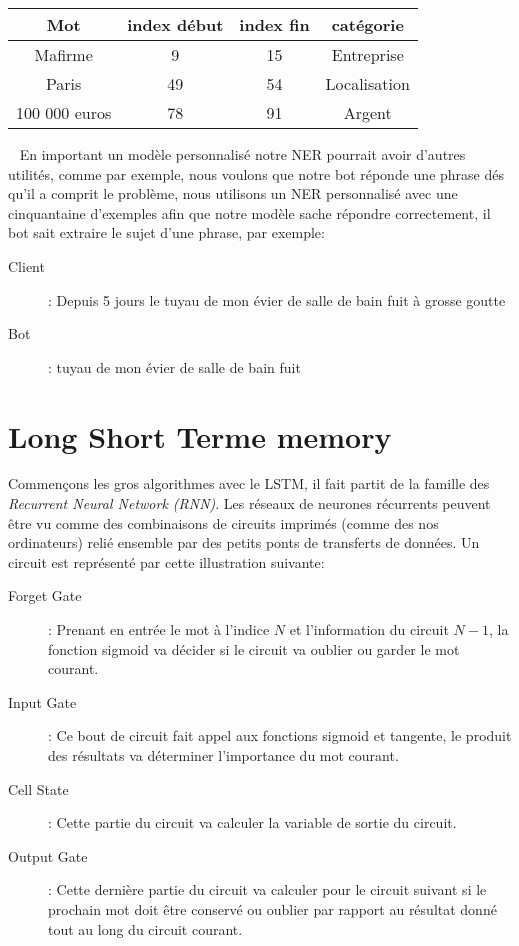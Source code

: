 
\begin{tabular}{c|cc|c}
Mot & index début & index fin & catégorie \\
\hline
Mafirme & 9 & 15 & Entreprise\\
Paris & 49 & 54 & Localisation\\
100 000 euros & 78 & 91 & Argent\\
\end{tabular}

\ \linebreak
En important un modèle personnalisé notre NER pourrait avoir d'autres utilités, comme par exemple, nous voulons que notre bot réponde une phrase dés qu'il a comprit le problème, nous utilisons un NER personnalisé avec une cinquantaine d'exemples afin que notre modèle sache répondre correctement, il bot sait extraire le sujet d'une phrase, par exemple:

\begin{description}
\item[Client]: Depuis 5 jours le tuyau de mon évier de salle de bain fuit à grosse goutte
\item[Bot]: tuyau de mon évier de salle de bain fuit
\end{description}

\pagebreak
\section{Long Short Terme memory}
Commençons les gros algorithmes avec le LSTM, il fait partit de la famille des \textit{Recurrent Neural Network (RNN)}. Les réseaux de neurones récurrents peuvent être vu comme des combinaisons de circuits imprimés (comme des nos ordinateurs) relié ensemble par des petits ponts de transferts de données. 
Un circuit est représenté par cette illustration suivante:


\begin{description}
\item[Forget Gate]: Prenant en entrée le mot à l'indice $N$ et l'information du circuit $N-1$, 
la fonction sigmoid va décider si le circuit va oublier ou garder le mot courant. 
\item[Input Gate]: Ce bout de circuit fait appel aux fonctions sigmoid et tangente, le produit des résultats va déterminer l'importance du mot courant.
\item[Cell State]: Cette partie du circuit va calculer la variable de sortie du circuit.
\item[Output Gate]: Cette dernière partie du circuit va calculer pour le circuit suivant si le prochain mot doit être conservé ou oublier par rapport au résultat donné tout au long du circuit courant.
\end{description}
\ \linebreak

